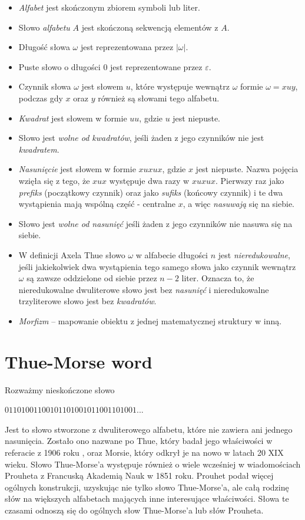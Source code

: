 \documentclass[document]{xmgr}
\begin{document}
\begin{itemize}
\item \emph{Alfabet} jest skończonym zbiorem symboli lub liter.
\item Słowo \emph{alfabetu} $A$ jest skończoną sekwencją elementów z $A$. 
\item Długość słowa $\omega$ jest reprezentowana przez $|\omega|$.
\item Puste słowo o długości $0$ jest reprezentowane przez $\varepsilon$.
\item Czynnik słowa $\omega$ jest słowem $u$, które występuje wewnątrz $\omega$ formie $\omega = xuy$, podczas gdy $x$ oraz $y$ również są słowami tego alfabetu.
\item \emph{Kwadrat} jest słowem w formie $uu$, gdzie $u$ jest niepuste.
\item Słowo jest \emph{wolne od kwadratów}, jeśli żaden z jego czynników nie jest \emph{kwadratem}.
\item \emph{Nasunięcie} jest słowem w formie $xuxux$, gdzie $x$ jest niepuste. Nazwa pojęcia wzięła się z tego, że $xux$ występuje dwa razy w $xuxux$. Pierwszy raz jako \emph{prefiks} (początkowy czynnik) oraz jako \emph{sufiks} (końcowy czynnik) i te dwa wystąpienia mają wspólną część - centralne $x$, a więc \textit{nasuwają} się na siebie.
\item Słowo jest \emph{wolne od nasunięć} jeśli żaden z jego czynników nie nasuwa się na siebie.
\item W definicji Axela Thue słowo $\omega$ w alfabecie długości $n$ jest \emph{nieredukowalne}, jeśli jakiekolwiek dwa wystąpienia tego samego słowa jako czynnik wewnątrz $\omega$ są zawsze oddzielone od siebie przez $n-2$ liter. Oznacza to, że nieredukowalne dwuliterowe słowo jest bez \emph{nasunięć} i nieredukowalne trzyliterowe słowo jest bez \emph{kwadratów}.
\item \emph{Morfizm} -- mapowanie obiektu z jednej matematycznej struktury w inną.
\end{itemize}



\section{Thue-Morse word}
Rozważmy nieskończone słowo

{\centering $01101001100101101001011001101001 ...$ \par}

Jest to słowo stworzone z dwuliterowego alfabetu, które nie zawiera ani jednego nasunięcia. Zostało ono nazwane po Thue, który badał jego właściwości w referacie z 1906 roku \cite{repetition2}, oraz Morsie, który odkrył je na nowo w latach 20 XIX wieku. Słowo Thue-Morse'a występuje również o wiele wcześniej w wiadomościach  Prouheta \cite{prouhet} z Francuską Akademią Nauk w 1851 roku. Prouhet podał więcej ogólnych konstrukcji, uzyskując nie tylko słowo Thue-Morse'a, ale całą rodzinę słów na większych alfabetach mających inne interesujące właściwości. Słowa te czasami odnoszą się do ogólnych słow Thue-Morse'a lub słów Prouheta.
\end{document}
